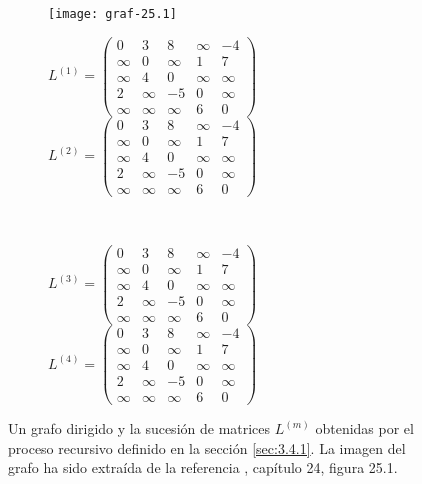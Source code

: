 \begin{figure}[htb]
	\centering
	\begin{subfigure}{\linewidth}
		\texttt{[image: graf-25.1]}
	\end{subfigure}

	\begin{subfigure}{\linewidth}
	$L^{(1)}=\begin{pmatrix}
		0 & 3 & 8 & \infty & -4\\
		\infty & 0 & \infty & 1 & 7 \\
		\infty & 4 & 0 & \infty & \infty \\
		2 & \infty & -5 & 0 & \infty \\
		\infty & \infty & \infty & 6 & 0
	\end{pmatrix}$
	$L^{(2)}=\begin{pmatrix}
		0 & 3 & 8 & \infty & -4\\
		\infty & 0 & \infty & 1 & 7 \\
		\infty & 4 & 0 & \infty & \infty \\
		2 & \infty & -5 & 0 & \infty \\
		\infty & \infty & \infty & 6 & 0
	\end{pmatrix}$
	\end{subfigure} \\
	\vspace{0.5cm}
	\begin{subfigure}{\linewidth}
	$L^{(3)}=\begin{pmatrix}
		0 & 3 & 8 & \infty & -4\\
		\infty & 0 & \infty & 1 & 7 \\
		\infty & 4 & 0 & \infty & \infty \\
		2 & \infty & -5 & 0 & \infty \\
		\infty & \infty & \infty & 6 & 0
	\end{pmatrix}$
	$L^{(4)}=\begin{pmatrix}
		0 & 3 & 8 & \infty & -4\\
		\infty & 0 & \infty & 1 & 7 \\
		\infty & 4 & 0 & \infty & \infty \\
		2 & \infty & -5 & 0 & \infty \\
		\infty & \infty & \infty & 6 & 0
	\end{pmatrix}$
	\end{subfigure}
	\caption{Un grafo dirigido y la sucesión de matrices $L^{(m)}$ obtenidas por el proceso recursivo definido en la sección \ref{sec:3.4.1}. La imagen del grafo ha sido extraída de la referencia \cite{algorithms}, capítulo 24, figura 25.1.}
	\label{fig:3.4.1}
\end{figure}

